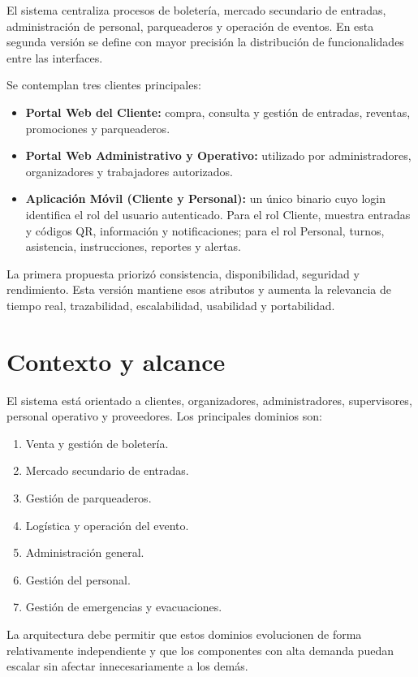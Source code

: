 \documentclass[12pt,a4paper]{article}
\begin{document}
El sistema centraliza procesos de boletería, mercado secundario de entradas, administración de personal, parqueaderos y operación de eventos. En esta segunda versión se define con mayor precisión la distribución de funcionalidades entre las interfaces.

Se contemplan tres clientes principales:

\begin{itemize}
\item \textbf{Portal Web del Cliente:} compra, consulta y gestión de entradas, reventas, promociones y parqueaderos.
\item \textbf{Portal Web Administrativo y Operativo:} utilizado por administradores, organizadores y trabajadores autorizados.
\item \textbf{Aplicación Móvil (Cliente y Personal):} un único binario cuyo login identifica el rol del
usuario autenticado. Para el rol Cliente, muestra entradas y códigos QR, información y
notificaciones; para el rol Personal, turnos, asistencia, instrucciones, reportes y alertas.
\end{itemize}

La primera propuesta priorizó consistencia, disponibilidad, seguridad y rendimiento. Esta versión mantiene esos atributos y aumenta la relevancia de tiempo real, trazabilidad, escalabilidad, usabilidad y portabilidad.

\section{Contexto y alcance}

El sistema está orientado a clientes, organizadores, administradores, supervisores, personal operativo y proveedores. Los principales dominios son:

\begin{enumerate}
\item Venta y gestión de boletería.
\item Mercado secundario de entradas.
\item Gestión de parqueaderos.
\item Logística y operación del evento.
\item Administración general.
\item Gestión del personal.
\item Gestión de emergencias y evacuaciones.
\end{enumerate}

La arquitectura debe permitir que estos dominios evolucionen de forma relativamente independiente y que los componentes con alta demanda puedan escalar sin afectar innecesariamente a los demás.
\end{document}
